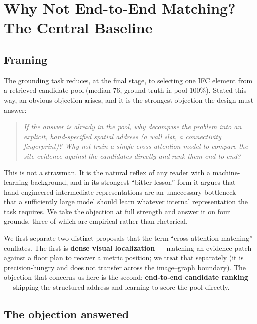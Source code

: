 \chapter{Why Not End-to-End Matching? The Central Baseline}
\label{ch:why}

\section{Framing}

The grounding task reduces, at the final stage, to selecting one IFC element from a retrieved
candidate pool (median 76, ground-truth in-pool 100\%). Stated this way, an obvious objection arises,
and it is the strongest objection the design must answer:

\begin{quote}
\emph{If the answer is already in the pool, why decompose the problem into an explicit,
hand-specified spatial address (a wall slot, a connectivity fingerprint)? Why not train a single
cross-attention model to compare the site evidence against the candidates directly and rank them
end-to-end?}
\end{quote}

This is not a strawman. It is the natural reflex of any reader with a machine-learning background,
and in its strongest ``bitter-lesson'' form \citep{sutton2019bitter} it argues that hand-engineered
intermediate representations are an unnecessary bottleneck --- that a sufficiently large model should
learn whatever internal representation the task requires. We take the objection at full strength and
answer it on four grounds, three of which are empirical rather than rhetorical.

We first separate two distinct proposals that the term ``cross-attention matching'' conflates. The
first is \textbf{dense visual localization} --- matching an evidence patch against a floor plan to
recover a metric position; we treat that separately (it is precision-hungry and does not transfer
across the image--graph boundary). The objection that concerns us here is the second:
\textbf{end-to-end candidate ranking} --- skipping the structured address and learning to score the
pool directly.

\section{The objection answered}

